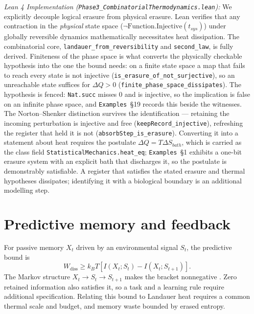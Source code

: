 \documentclass{article}
\renewcommand{\cite}[1]{\citep{#1}}
\begin{document}
\textit{Lean 4 Implementation (\nolinkurl{Phase3_CombinatorialThermodynamics.lean}):} We explicitly decouple logical erasure from physical erasure. Lean verifies that any contraction in the \textit{physical} state space ($\neg \text{Function.Injective}(t_{sys})$) under globally reversible dynamics mathematically necessitates heat dissipation. The combinatorial core, \nolinkurl{landauer_from_reversibility} and \nolinkurl{second_law}, is fully derived. Finiteness of the phase space is what converts the physically checkable hypothesis into the one the bound needs: on a finite state space a map that fails to reach every state is not injective (\nolinkurl{is_erasure_of_not_surjective}), so an unreachable state suffices for $\Delta Q > 0$ (\nolinkurl{finite_phase_space_dissipates}). The hypothesis is fenced: \texttt{Nat.succ} misses $0$ and is injective, so the implication is false on an infinite phase space, and \texttt{Examples}~\S19 records this beside the witnesses. The Norton--Shenker distinction survives the identification --- retaining the incoming perturbation is injective and free (\nolinkurl{keepRecord_injective}), refreshing the register that held it is not (\nolinkurl{absorbStep_is_erasure}). Converting it into a statement about heat requires the postulate $\Delta Q = T \Delta S_{bath}$, which is carried as the class field \nolinkurl{StatisticalMechanics.heat_eq}; \texttt{Examples}~\S1 exhibits a one-bit erasure system with an explicit bath that discharges it, so the postulate is demonstrably satisfiable. A register that satisfies the stated erasure and thermal hypotheses dissipates; identifying it with a biological boundary is an additional modelling step.

\section{Predictive memory and feedback}
\label{sec:supp-feedback}
For passive memory $X_t$ driven by an environmental signal $S_t$, the predictive bound is
\begin{equation}
 W_{\mathrm{diss}}\geq k_BT\left[I(X_t;S_t)-I(X_t;S_{t+1})\right].
 \label{eq:predictive}
\end{equation}
The Markov structure $X_t\to S_t\to S_{t+1}$ makes the bracket nonnegative \cite{still2012}. Zero retained information also satisfies it, so a task and a learning rule require additional specification. Relating this bound to Landauer heat requires a common thermal scale and budget, and memory waste bounded by erased entropy.
\end{document}

